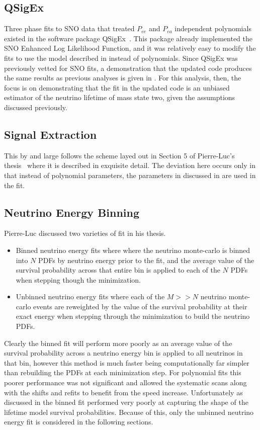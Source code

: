 \subsection{QSigEx}

Three phase fits to SNO data that treated $P_{ee}$ and $P_{ea}$ independent polynomials existed in the software package QSigEx~\cite{plthesis}.
This package already implemented the SNO Enhanced Log Likelihood Function, and it was relatively easy to modify the fits to use the model described in  instead of polynomials.
Since QSigEx was previously vetted for SNO fits, a demonstration that the updated code produces the same results as previous analyses is given in .
For this analysis, then, the focus is on demonstrating that the fit in the updated code is an unbiased estimator of the neutrino lifetime of mass state two, given the assumptions discussed previously. 

\subsection{Signal Extraction}

This by and large follows the scheme layed out in Section 5 of Pierre-Luc's thesis~\cite{plthesis} where it is described in exquisite detail. 
The deviation here occurs only in that instead of polynomial parameters, the parameters in discussed in  are used in the fit.

\subsection{Neutrino Energy Binning}

Pierre-Luc discussed two varieties of fit in his thesis.
\begin{itemize}
\item Binned neutrino energy fits where where the neutrino monte-carlo is binned into $N$ PDFs by neutrino energy prior to the fit, and the average value of the survival probability across that entire bin is applied to each of the $N$ PDFs when stepping though the minimization.
\item Unbinned neutrino energy fits where each of the $M >> N$ neutrino monte-carlo events are reweighted by the value of the survival probability at their exact energy when stepping through the minimization to build the neutrino PDFs.
\end{itemize}
Clearly the binned fit will perform more poorly as an average value of the survival probability across a neutrino energy bin is applied to all neutrinos in that bin, however this method is much faster being computationally far simpler than rebuilding the PDFs at each minimization step. 
For polynomial fits this poorer performance was not significant and allowed the systematic scans along with the shifts and refits to benefit from the speed increase.
Unfortunately as discussed in  the binned fit performed very poorly at capturing the shape of the lifetime model survival probabilities.
Because of this, only the unbinned neutrino energy fit is considered in the following sections.

